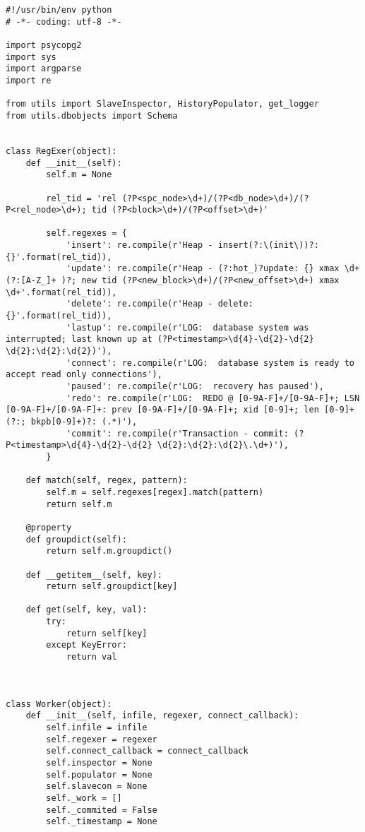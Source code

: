 \begin{lstlisting}[caption={history.py}]
#!/usr/bin/env python
# -*- coding: utf-8 -*-

import psycopg2
import sys
import argparse
import re

from utils import SlaveInspector, HistoryPopulator, get_logger
from utils.dbobjects import Schema


class RegExer(object):
    def __init__(self):
        self.m = None

        rel_tid = 'rel (?P<spc_node>\d+)/(?P<db_node>\d+)/(?P<rel_node>\d+); tid (?P<block>\d+)/(?P<offset>\d+)'

        self.regexes = {
            'insert': re.compile(r'Heap - insert(?:\(init\))?: {}'.format(rel_tid)),
            'update': re.compile(r'Heap - (?:hot_)?update: {} xmax \d+ (?:[A-Z_]+ )?; new tid (?P<new_block>\d+)/(?P<new_offset>\d+) xmax \d+'.format(rel_tid)),
            'delete': re.compile(r'Heap - delete: {}'.format(rel_tid)),
            'lastup': re.compile(r'LOG:  database system was interrupted; last known up at (?P<timestamp>\d{4}-\d{2}-\d{2} \d{2}:\d{2}:\d{2})'),
            'connect': re.compile(r'LOG:  database system is ready to accept read only connections'),
            'paused': re.compile(r'LOG:  recovery has paused'),
            'redo': re.compile(r'LOG:  REDO @ [0-9A-F]+/[0-9A-F]+; LSN [0-9A-F]+/[0-9A-F]+: prev [0-9A-F]+/[0-9A-F]+; xid [0-9]+; len [0-9]+(?:; bkpb[0-9]+)?: (.*)'),
            'commit': re.compile(r'Transaction - commit: (?P<timestamp>\d{4}-\d{2}-\d{2} \d{2}:\d{2}:\d{2}\.\d+)'),
        }

    def match(self, regex, pattern):
        self.m = self.regexes[regex].match(pattern)
        return self.m

    @property
    def groupdict(self):
        return self.m.groupdict()

    def __getitem__(self, key):
        return self.groupdict[key]

    def get(self, key, val):
        try:
            return self[key]
        except KeyError:
            return val



class Worker(object):
    def __init__(self, infile, regexer, connect_callback):
        self.infile = infile
        self.regexer = regexer
        self.connect_callback = connect_callback
        self.inspector = None
        self.populator = None
        self.slavecon = None
        self._work = []
        self._commited = False
        self._timestamp = None


\end{lstlisting}

